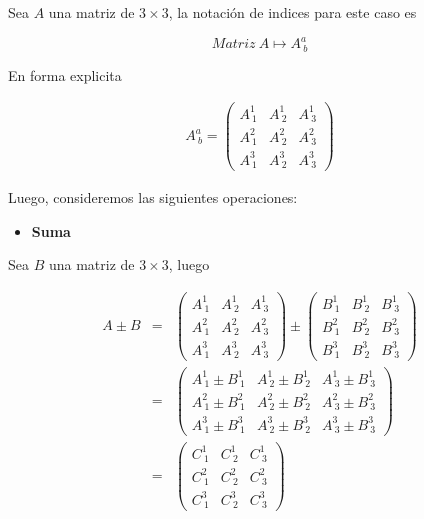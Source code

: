 \documentclass[12pt]{report}
\begin{document}
Sea $A$ una  matriz de $3\times3$, la notación de indices para este caso es 

\begin{equation} \nonumber
Matriz \ A \longmapsto A^a_{\ b}
\end{equation}  

En forma explicita

\begin{eqnarray} \label{2.64}
A^a_{\ b}=
\left(
\begin{array}{ccc}
A^1_{\ 1} & A^1_{\ 2} & A^1_{\ 3} \\
A^2_{\ 1} & A^2_{\ 2} & A^2_{\ 3} \\
A^3_{\ 1} & A^3_{\ 2} & A^3_{\ 3}
\end{array}
\right)
\end{eqnarray}


Luego, consideremos las siguientes operaciones: \\
\begin{itemize}
 \item \textbf{Suma} \\
\end{itemize}
 Sea $B$ una matriz de $ 3\times 3$, luego


\begin{eqnarray} \nonumber
A\pm B &=& 
\left(
\begin{array}{ccc} \nonumber
A^1_{\ 1} & A^1_{\ 2} & A^1_{\ 3} \\
A^2_{\ 1} & A^2_{\ 2} & A^2_{\ 3} \\
A^3_{\ 1} & A^3_{\ 2} & A^3_{\ 3}
\end{array}
\right) \pm 
\left(
\begin{array}{ccc} \nonumber
B^1_{\ 1} & B^1_{\ 2} & B^1_{\ 3} \\
B^2_{\ 1} & B^2_{\ 2} & B^2_{\ 3} \\
B^3_{\ 1} & B^3_{\ 2} & B^3_{\ 3}
\end{array}
\right) \\ \nonumber
&=&
\left(
\begin{array}{ccc} \nonumber
A^1_{\ 1} \pm B^1_{\ 1} & A^1_{\ 2} \pm B^1_{\ 2} & A^1_{\ 3} \pm B^1_{\ 3} \\
A^2_{\ 1} \pm B^2_{\ 1} & A^2_{\ 2} \pm B^2_{\ 2} & A^2_{\ 3} \pm B^2_{\ 3} \\
A^3_{\ 1} \pm B^3_{\ 1} & A^3_{\ 2} \pm B^3_{\ 2} & A^3_{\ 3} \pm B^3_{\ 3}
\end{array}
\right) \\ \nonumber
&=&
\left(
\begin{array}{ccc}
C^1_{\ 1} & C^1_{\ 2} & C^1_{\ 3} \\
C^2_{\ 1} & C^2_{\ 2} & C^2_{\ 3} \\
C^3_{\ 1} & C^3_{\ 2} & C^3_{\ 3}
\end{array}
\right)
\end{eqnarray}
\end{document}
